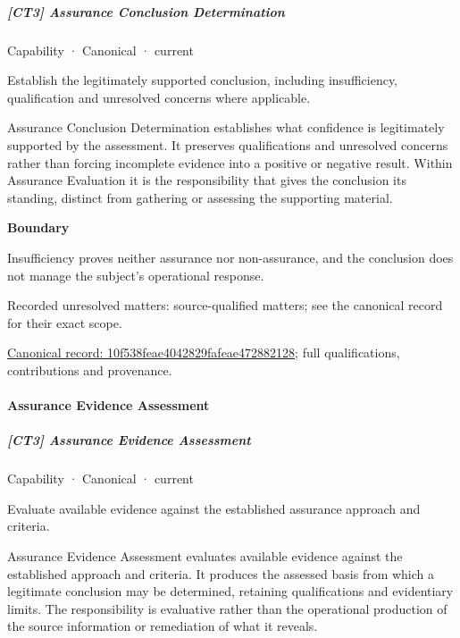 \subparagraph{[CT3] Assurance Conclusion Determination}

\label{element:10f538feae4042829fafeae472882128}
{\small Capability · Canonical · current}\par

Establish the legitimately supported conclusion, including insufficiency, qualification and unresolved concerns where applicable.



Assurance Conclusion Determination establishes what confidence is legitimately supported by the assessment. It preserves qualifications and unresolved concerns rather than forcing incomplete evidence into a positive or negative result. Within Assurance Evaluation it is the responsibility that gives the conclusion its standing, distinct from gathering or assessing the supporting material.



\textbf{Boundary}



Insufficiency proves neither assurance nor non-assurance, and the conclusion does not manage the subject's operational response.


{\small Recorded unresolved matters: source-qualified matters; see the canonical record for their exact scope.}\par
{\footnotesize \href{../../../../continuum/strategy/capability/10f538feae4042829fafeae472882128.md}{Canonical record: 10f538feae4042829fafeae472882128}; full qualifications, contributions and provenance.}\par
\paragraph{Assurance Evidence Assessment}

\subparagraph{[CT3] Assurance Evidence Assessment}

\label{element:1b295763b37f4622bd1bb80c6ea3741c}
{\small Capability · Canonical · current}\par

Evaluate available evidence against the established assurance approach and criteria.



Assurance Evidence Assessment evaluates available evidence against the established approach and criteria. It produces the assessed basis from which a legitimate conclusion may be determined, retaining qualifications and evidentiary limits. The responsibility is evaluative rather than the operational production of the source information or remediation of what it reveals.



